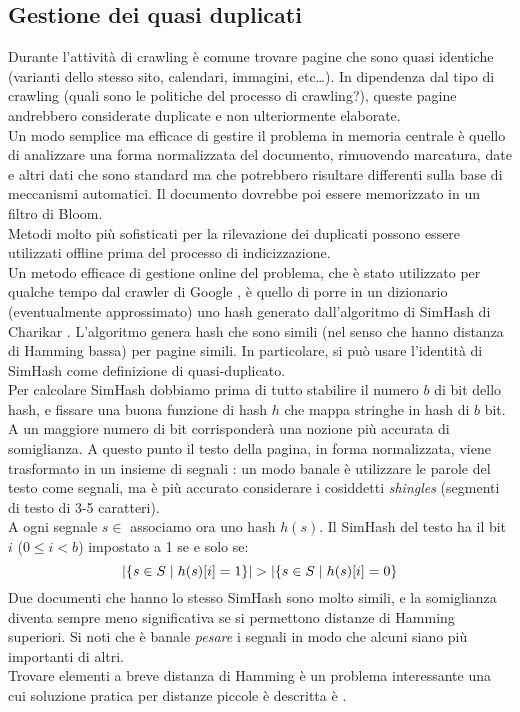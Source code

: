 \subsection{Gestione dei quasi duplicati}
Durante l'attività di crawling è comune trovare pagine che sono quasi identiche (varianti dello stesso sito, calendari, immagini, etc\dots). In dipendenza dal tipo di crawling (quali sono le politiche del processo di crawling?), queste pagine andrebbero considerate duplicate e non ulteriormente elaborate.\\
Un modo semplice ma efficace di gestire il problema in memoria centrale è quello di analizzare una forma normalizzata del documento, rimuovendo marcatura, date e altri dati che sono standard ma che potrebbero risultare differenti sulla base di meccanismi automatici. Il documento dovrebbe poi essere memorizzato in un filtro di Bloom.\\
Metodi molto più sofisticati per la rilevazione dei duplicati possono essere utilizzati offline prima del processo di indicizzazione.\\
Un metodo efficace di gestione online del problema, che è stato utilizzato per qualche tempo dal crawler di Google \cite{google}, è quello di porre in un dizionario (eventualmente approssimato) uno hash generato dall'algoritmo di SimHash di Charikar \cite{SimHash}. L'algoritmo genera hash che sono simili (nel senso che hanno distanza di Hamming bassa) per pagine simili. In particolare, si può usare l'identità di SimHash come definizione di quasi-duplicato.\\
Per calcolare SimHash dobbiamo prima di tutto stabilire il numero $b$ di bit dello hash, e fissare una buona funzione di hash $h$ che mappa stringhe in hash di $b$ bit. A un maggiore numero di bit corrisponderà una nozione più accurata di somiglianza. A questo punto il testo della pagina, in forma normalizzata, viene trasformato in un insieme di segnali : un modo banale è utilizzare le parole del testo come segnali, ma è più accurato considerare i cosiddetti \textit{shingles} (segmenti di testo di 3-5 caratteri).\\
A ogni segnale $s \in$  associamo ora uno hash $h(s)$. Il SimHash del testo ha il bit $i$ ($0 \leq i < b$) impostato a 1 se e solo se:
\begin{equation*}
    |\{s \in S \hspace{1mm}|\hspace{1mm} h(s)[i] = 1\}| > |\{s \in S \hspace{1mm}|\hspace{1mm} h(s)[i] = 0\}
\end{equation*}
Due documenti che hanno lo stesso SimHash sono molto simili, e la somiglianza diventa sempre meno significativa se si permettono distanze di Hamming superiori. Si noti che è banale \textit{pesare} i segnali in modo che alcuni siano più importanti di altri.\\
Trovare elementi a breve distanza di Hamming è un problema interessante una cui soluzione pratica per distanze piccole è descritta è \cite{google}.\\
